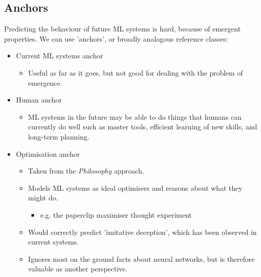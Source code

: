 \documentclass{article}
\begin{document}
\begin{multicols}{2}
\subsection*{Anchors}
Predicting the behaviour of future ML systems is hard, because of emergent properties. We can use 'anchors', or broadly analogous reference classes:
\begin{itemize}
    \item Current ML systems anchor
    \begin{itemize}
        \item Useful as far as it goes, but not good for dealing with the problem of emergence.
    \end{itemize}
    \item Human anchor
    \begin{itemize}
        \item ML systems in the future may be able to do things that humans can currently do well such as master tools, efficient learning of new skills, and long-term planning.
    \end{itemize}
    \item Optimisation anchor
    \begin{itemize}
        \item Taken from the \emph{Philosophy} approach.
        \item Models ML systems as ideal optimisers and reasons about what they might do.
        \begin{itemize}
            \item e.g. the paperclip maximiser thought experiment
        \end{itemize}
        \item Would correctly predict 'imitative deception', which has been observed in current systems.
        \item Ignores most on the ground facts about neural networks, but is therefore valuable as another perspective.
    \end{itemize}
\end{itemize}


\end{multicols}
\end{document}
